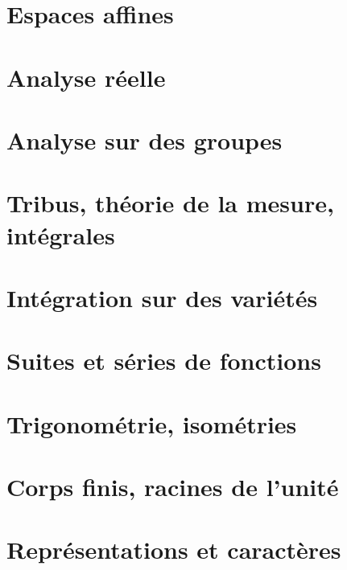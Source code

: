 \documentclass[a4paper,twoside,11pt]{book}
\begin{document}
\chapter{Espaces affines}


\chapter{Analyse réelle}








\chapter{Analyse sur des groupes}


\chapter{Tribus, théorie de la mesure, intégrales}






\chapter{Intégration sur des variétés}






\chapter{Suites et séries de fonctions}



\chapter{Trigonométrie, isométries}





\chapter{Corps finis, racines de l'unité}



\chapter{Représentations et caractères}

\end{document}
